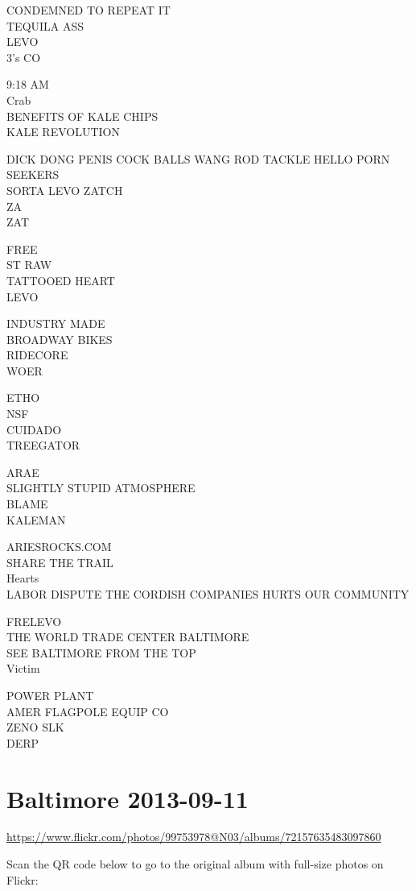 \documentclass[10pt,letterpaper]{article}
\begin{document}
CONDEMNED TO REPEAT IT\\
TEQUILA ASS\\
LEVO\\
3's CO

9:18 AM\\
Crab\\
BENEFITS OF KALE CHIPS\\
KALE REVOLUTION

DICK DONG PENIS COCK BALLS WANG ROD TACKLE HELLO PORN SEEKERS\\
SORTA LEVO ZATCH\\
ZA\\
ZAT

FREE\\
ST RAW\\
TATTOOED HEART\\
LEVO

INDUSTRY MADE\\
BROADWAY BIKES\\
RIDECORE\\
WOER

ETHO\\
NSF\\
CUIDADO\\
TREEGATOR

ARAE\\
SLIGHTLY STUPID ATMOSPHERE\\
BLAME\\
KALEMAN

ARIESROCKS.COM\\
SHARE THE TRAIL\\
Hearts\\
LABOR DISPUTE THE CORDISH COMPANIES HURTS OUR COMMUNITY

FRELEVO\\
THE WORLD TRADE CENTER BALTIMORE\\
SEE BALTIMORE FROM THE TOP\\
Victim

POWER PLANT\\
AMER FLAGPOLE EQUIP CO\\
ZENO SLK\\
DERP


\section*{Baltimore 2013-09-11}

\url{https://www.flickr.com/photos/99753978@N03/albums/72157635483097860}

Scan the QR code below to go to the original album with full-size photos on Flickr:
\end{document}
